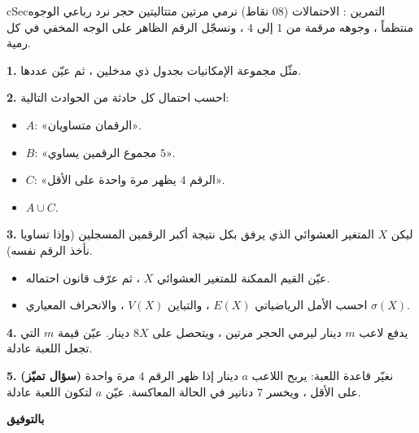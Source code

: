 \documentclass[12pt,a4paper]{article}
\newenvironment{BOX}[2]{\begin{otherlanguage}{english}\begin{arbox}{#1}{#2}}{\end{arbox}\end{otherlanguage}}
\newcounter{exo}
\newenvironment{tamrin}[1]{\stepcounter{exo}\begin{BOX}{cSec}{التمرين \theexo: #1}}{\end{BOX}}
\newenvironment{sq}{\begin{itemize}[leftmargin=2.4em,itemsep=3pt]}{\end{itemize}}
\newcommand{\qa}{\item[(أ)]}\newcommand{\qb}{\item[(ب)]}\newcommand{\qc}{\item[(جـ)]}\newcommand{\qd}{\item[(د)]}\newcommand{\qe}{\item[(هـ)]}
\newcommand{\QQ}[1]{\par\smallskip\textbf{#1.} }
\begin{document}
\begin{tamrin}{الاحتمالات (08 نقاط)}
نرمي مرتين متتاليتين حجر نرد رباعي الوجوه منتظماً ، وجوهه مرقمة من $1$ إلى $4$ ، ونسجّل الرقم الظاهر على الوجه المخفي في كل رمية.
\QQ{1} مثّل مجموعة الإمكانيات بجدول ذي مدخلين ، ثم عيّن عددها.
\QQ{2} احسب احتمال كل حادثة من الحوادث التالية:
\begin{sq}
\qa $A$: «الرقمان متساويان».
\qb $B$: «مجموع الرقمين يساوي $5$».
\qc $C$: «الرقم $4$ يظهر مرة واحدة على الأقل».
\qd $A\cup C$.
\end{sq}
\QQ{3} ليكن $X$ المتغير العشوائي الذي يرفق بكل نتيجة أكبر الرقمين المسجلين (وإذا تساويا نأخذ الرقم نفسه).
\begin{sq}
\qa عيّن القيم الممكنة للمتغير العشوائي $X$ ، ثم عرّف قانون احتماله.
\qb احسب الأمل الرياضياتي $E(X)$ ، والتباين $V(X)$ ، والانحراف المعياري $\sigma(X)$.
\end{sq}
\QQ{4} يدفع لاعب $m$ دينار ليرمي الحجر مرتين ، ويتحصل على $8X$ دينار. عيّن قيمة $m$ التي تجعل اللعبة عادلة.
\QQ{5} \textbf{(سؤال تميّز)} نغيّر قاعدة اللعبة: يربح اللاعب $a$ دينار إذا ظهر الرقم $4$ مرة واحدة على الأقل ، ويخسر $7$ دنانير في الحالة المعاكسة. عيّن $a$ لتكون اللعبة عادلة.
\end{tamrin}
\begin{center}\textbf{\color{cSec}بالتوفيق}\end{center}
\end{document}
